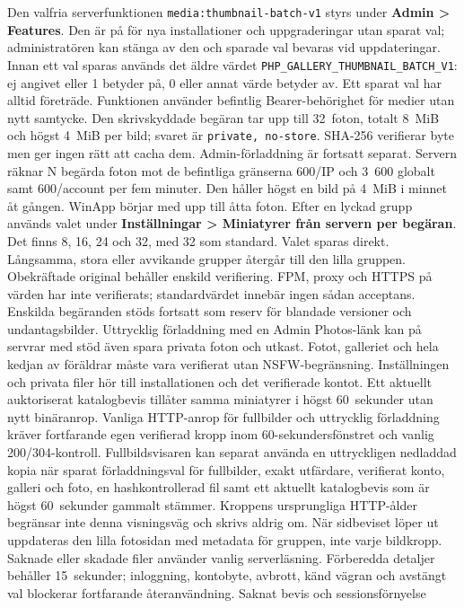 \documentclass[11pt,a4paper]{article}
\newcommand{\ui}[1]{\textbf{#1}}
\newcommand{\codeword}[1]{\nolinkurl{#1}}
\begin{document}
Den valfria serverfunktionen \codeword{media:thumbnail-batch-v1} styrs under
\ui{Admin > Features}. Den är på för nya installationer och uppgraderingar
utan sparat val; administratören kan stänga av den och sparade val bevaras vid
uppdateringar. Innan ett val sparas används det äldre värdet
\codeword{PHP_GALLERY_THUMBNAIL_BATCH_V1}: ej angivet eller 1 betyder på,
0 eller annat värde betyder av. Ett sparat val har alltid företräde. Funktionen
använder befintlig Bearer-behörighet för medier utan nytt samtycke. Den skrivskyddade
begäran tar upp till 32~foton, totalt 8~MiB och högst 4~MiB per bild; svaret är
\texttt{private, no-store}. SHA-256 verifierar byte men ger ingen rätt att cacha
dem. Admin-förladdning är fortsatt separat. Servern räknar N begärda foton mot
de befintliga gränserna 600/IP och 3~600 globalt samt 600/account per fem minuter.
Den håller högst en bild på 4~MiB i minnet åt gången. WinApp börjar med upp
till åtta foton. Efter en lyckad grupp används valet under
\ui{Inställningar > Miniatyrer från servern per begäran}. Det finns 8, 16,
24 och 32, med 32 som standard. Valet sparas direkt. Långsamma, stora eller
avvikande grupper återgår till den lilla gruppen. Obekräftade original behåller enskild
verifiering. FPM, proxy och HTTPS på värden har inte verifierats; standardvärdet
innebär ingen sådan acceptans. Enskilda begäranden
stöds fortsatt som reserv för blandade versioner och undantagsbilder.
Uttrycklig förladdning med en Admin Photos-länk kan på servrar med stöd även
spara privata foton och utkast. Fotot, galleriet och hela kedjan av föräldrar
måste vara verifierat utan NSFW-begränsning. Inställningen och privata filer
hör till installationen och det verifierade kontot. Ett aktuellt auktoriserat
katalogbevis tillåter samma miniatyrer i högst 60~sekunder utan nytt binäranrop.
Vanliga HTTP-anrop för fullbilder och uttrycklig förladdning kräver fortfarande
egen verifierad kropp inom 60-sekundersfönstret och vanlig 200/304-kontroll.
Fullbildsvisaren kan separat använda en uttryckligen nedladdad kopia när sparat
förladdningsval för fullbilder, exakt utfärdare, verifierat konto, galleri och
foto, en hashkontrollerad fil samt ett aktuellt katalogbevis som är högst
60~sekunder gammalt stämmer. Kroppens ursprungliga HTTP-ålder begränsar inte
denna visningsväg och skrivs aldrig om. När sidbeviset löper ut uppdateras den
lilla fotosidan med metadata för gruppen, inte varje bildkropp. Saknade eller
skadade filer använder vanlig serverläsning. Förberedda detaljer behåller
15~sekunder; inloggning, kontobyte, avbrott, känd vägran och avstängt val
blockerar fortfarande återanvändning. Saknat bevis och sessionsförnyelse
\end{document}
